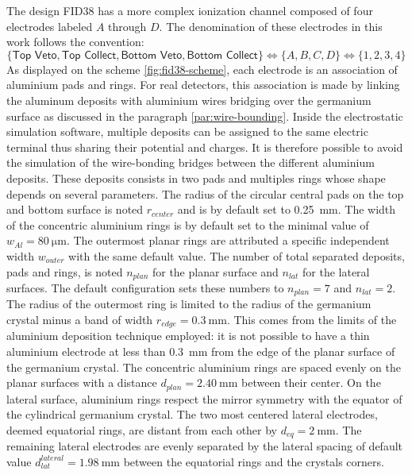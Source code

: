 The design FID38 has a more complex ionization channel composed of four electrodes labeled $A$ through $D$. The denomination of these electrodes in this work follows the convention:
\begin{equation}
\label{eq:fid38-convention}
\lbrace \textsf{Top Veto}, \textsf{Top Collect}, \textsf{Bottom Veto}, \textsf{Bottom Collect} \rbrace
\Leftrightarrow 
\lbrace A, B, C, D \rbrace
\Leftrightarrow
\lbrace 1, 2, 3, 4 \rbrace
\end{equation}
 As displayed on the scheme \ref{fig:fid38-scheme}, each electrode is an association of aluminium pads and rings. 
For real detectors, this association is made by linking the aluminum deposits with aluminium wires bridging over the germanium surface as discussed in the paragraph \ref{par:wire-bounding}.
Inside the electrostatic simulation software, multiple deposits can be assigned to the same electric terminal thus sharing their potential and charges. It is therefore possible to avoid the simulation of the wire-bonding bridges between the different aluminium deposits.
These deposits consists in two pads and multiples rings whose shape depends on several parameters. The radius of the circular central pads on the top and bottom surface is noted $r_{center}$ and is by default set to \SI{0.25}{\mm}. The width of the concentric aluminium rings is by default set to the minimal value of $w_{Al} = \SI{80}{\micro\meter}$. The outermost planar rings are attributed a specific independent width $w_{outer}$ with the same default value. The number of total separated deposits, pads and rings, is noted $n_{plan}$ for the planar surface and $n_{lat}$ for the lateral surfaces. The default configuration sets these numbers to $n_{plan}=7$ and $n_{lat}=2$. The radius of the outermost ring is limited to the radius of the germanium crystal minus a band of width $r_{edge}=\SI{0.3}{\mm}$. This comes from the limits of the aluminium deposition technique employed: it is not possible to have a thin aluminium electrode at less than \SI{0.3}{\mm} from the edge of the planar surface of the germanium crystal. The concentric aluminium rings are spaced evenly on the planar surfaces with a distance $d_{plan}=\SI{2.40}{\mm}$ between their center. On the lateral surface, aluminium rings respect the mirror symmetry with the equator of the cylindrical germanium crystal. The two most centered lateral electrodes, deemed equatorial rings, are distant from each other by $d_{eq}=\SI{2}{\mm}$. The remaining lateral electrodes are evenly separated by the lateral spacing of default value $d_{lat}^{lateral}=\SI{1.98}{\mm}$ between the equatorial rings and the crystals corners.
